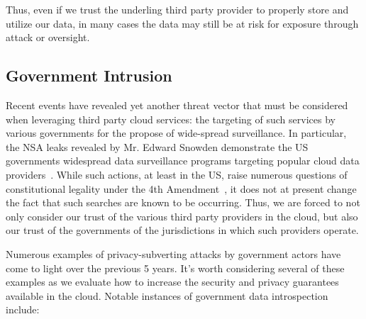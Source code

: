 Thus, even if we trust the underling third party provider to properly
store and utilize our data, in many cases the data may still be at
risk for exposure through attack or oversight.

\subsection{Government Intrusion}

Recent events have revealed yet another threat vector that must be
considered when leveraging third party cloud services: the targeting
of such services by various governments for the propose of wide-spread
surveillance. In particular, the NSA leaks revealed by Mr. Edward
Snowden demonstrate the US governments widespread data surveillance
programs targeting popular cloud data
providers~\cite{greenwald-prism}. While such actions, at least in the
US, raise numerous questions of constitutional legality under the 4th
Amendment~\cite{us-constitution-amend4}, it does not at present change
the fact that such searches are known to be occurring. Thus, we are
forced to not only consider our trust of the various third party
providers in the cloud, but also our trust of the governments of the
jurisdictions in which such providers operate.

Numerous examples of privacy-subverting attacks by government actors
have come to light over the previous 5 years. It's worth considering
several of these examples as we evaluate how to increase the security
and privacy guarantees available in the cloud. Notable instances of
government data introspection include:

